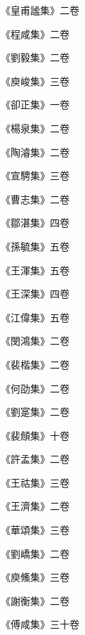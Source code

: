 \begin{pinyinscope}
 《皇甫謐集》二卷



 《程咸集》二卷



 《劉毅集》二卷



 《庾峻集》三卷



 《卻正集》一卷



 《楊泉集》二卷



 《陶濬集》二卷



 《宣騁集》三卷



 《曹志集》二卷



 《鄒湛集》四卷



 《孫毓集》五卷



 《王渾集》五卷



 《王深集》四卷



 《江偉集》五卷



 《閔鴻集》二卷



 《裴楷集》二卷



 《何劭集》二卷



 《劉寔集》二卷



 《裴頠集》十卷



 《許孟集》二卷



 《王祜集》三卷



 《王濟集》二卷



 《華頌集》三卷



 《劉嶠集》二卷



 《庾鯈集》三卷



 《謝衡集》二卷



 《傅咸集》三十卷




\end{pinyinscope}
